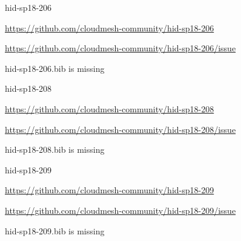\begin{IU}

hid-sp18-206

\url{https://github.com/cloudmesh-community/hid-sp18-206}

\url{https://github.com/cloudmesh-community/hid-sp18-206/issue}

hid-sp18-206.bib is missing

\end{IU}


\begin{IU}

hid-sp18-208

\url{https://github.com/cloudmesh-community/hid-sp18-208}

\url{https://github.com/cloudmesh-community/hid-sp18-208/issue}

hid-sp18-208.bib is missing

\end{IU}


\begin{IU}

hid-sp18-209

\url{https://github.com/cloudmesh-community/hid-sp18-209}

\url{https://github.com/cloudmesh-community/hid-sp18-209/issue}

hid-sp18-209.bib is missing

\end{IU}


